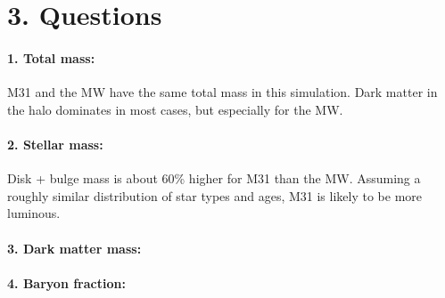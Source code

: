 \section*{3. Questions}

\paragraph{1. Total mass:} M31 and the MW have the same total mass in this simulation. Dark matter in the halo dominates in most cases, but especially for the MW.

\paragraph{2. Stellar mass:} Disk + bulge mass is about 60\% higher for M31 than the MW. Assuming a roughly similar distribution of star types and ages, M31 is likely to be more luminous.

\paragraph{3. Dark matter mass:} 

\paragraph{4. Baryon fraction:} 


